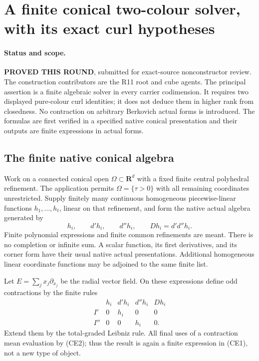 \section{A finite conical two-colour solver, with its exact curl hypotheses}
\label{sec:r11-conical-euler}

\paragraph{Status and scope.}
\textbf{PROVED THIS ROUND}, submitted for exact-source nonconstructor
review.  The construction contributors are the R11 root and cube agents.
The principal assertion is a finite algebraic solver in every carrier
codimension.  It requires two displayed pure-colour curl identities;
it does not deduce them in higher rank from closedness.  No contraction
on arbitrary Berkovich actual forms is introduced.  The formulas are
first verified in a specified native conical presentation and their
outputs are finite expressions in actual forms.

\subsection{The finite native conical algebra}

Work on a connected conical open $\Omega\subset\mathbf R^d$ with a
fixed finite central polyhedral refinement.  The application permits
$\Omega=\{\tau>0\}$ with all remaining coordinates unrestricted.
Supply finitely many continuous homogeneous piecewise-linear functions
$h_1,\ldots,h_t$, linear on that refinement, and form the native
actual algebra generated by
\[
 h_i,\qquad d'h_i,\qquad d''h_i,\qquad Dh_i=d'd''h_i.
 \tag{CE1}
\]
Finite polynomial expressions and finite common refinements are meant.
There is no completion or infinite sum.  A scalar function, its first
derivatives, and its corner form have their usual native actual
presentations.  Additional homogeneous linear coordinate functions
may be adjoined to the same finite list.

Let $E=\sum_jx_j\partial_{x_j}$ be the radial vector field.  On
these expressions define odd contractions by the finite rules
\[
\begin{array}{c|cccc}
 &h_i&d'h_i&d''h_i&Dh_i\\\hline
 I'&0&h_i&0&0\\
 I''&0&0&h_i&0.
\end{array}
\tag{CE2}
\]
Extend them by the total-graded Leibniz rule.  All final uses of a
contraction mean evaluation by (CE2); thus the result is again a
finite expression in (CE1), not a new type of object.

